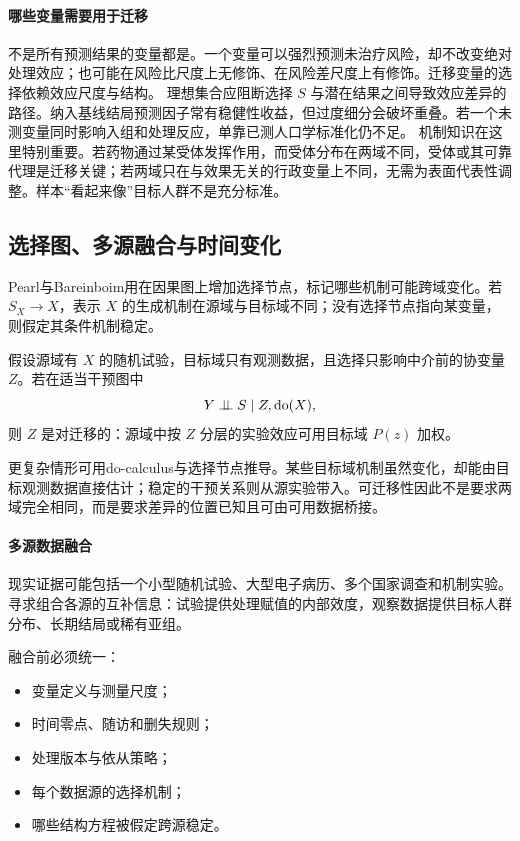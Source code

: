 \paragraph{哪些变量需要用于迁移}

不是所有预测结果的变量都是。一个变量可以强烈预测未治疗风险，却不改变绝对处理效应；也可能在风险比尺度上无修饰、在风险差尺度上有修饰。迁移变量的选择依赖效应尺度与结构。
理想集合应阻断选择 $S$ 与潜在结果之间导致效应差异的路径。纳入基线结局预测因子常有稳健性收益，但过度细分会破坏重叠。若一个未测变量同时影响入组和处理反应，单靠已测人口学标准化仍不足。
机制知识在这里特别重要。若药物通过某受体发挥作用，而受体分布在两域不同，受体或其可靠代理是迁移关键；若两域只在与效果无关的行政变量上不同，无需为表面代表性调整。样本“看起来像”目标人群不是充分标准。

\subsection{选择图、多源融合与时间变化}

Pearl与Bareinboim用在因果图上增加选择节点，标记哪些机制可能跨域变化\parencite{pearlbareinboim2014}。若 $S_X\rightarrow X$，表示 $X$ 的生成机制在源域与目标域不同；没有选择节点指向某变量，则假定其条件机制稳定。

假设源域有 $X$ 的随机试验，目标域只有观测数据，且选择只影响中介前的协变量 $Z$。若在适当干预图中
\[
Y\mathrel{\perp\!\!\!\perp} S\mid Z,\operatorname{do}(X),
\]
则 $Z$ 是对迁移的：源域中按 $Z$ 分层的实验效应可用目标域 $P(z)$ 加权。

更复杂情形可用do-calculus与选择节点推导。某些目标域机制虽然变化，却能由目标观测数据直接估计；稳定的干预关系则从源实验带入。可迁移性因此不是要求两域完全相同，而是要求差异的位置已知且可由可用数据桥接。

\paragraph{多源数据融合}

现实证据可能包括一个小型随机试验、大型电子病历、多个国家调查和机制实验。寻求组合各源的互补信息：试验提供处理赋值的内部效度，观察数据提供目标人群分布、长期结局或稀有亚组。

融合前必须统一：

\begin{itemize}
  \item 变量定义与测量尺度；
  \item 时间零点、随访和删失规则；
  \item 处理版本与依从策略；
  \item 每个数据源的选择机制；
  \item 哪些结构方程被假定跨源稳定。
\end{itemize}

